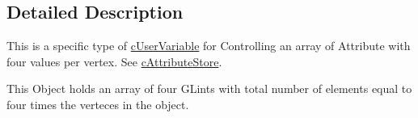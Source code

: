 \subsection{Detailed Description}
This is a specific type of \hyperlink{classc_user_variable}{cUserVariable} for Controlling an array of Attribute with four values per vertex. See \hyperlink{classc_attribute_store}{cAttributeStore}. 

This Object holds an array of four GLints with total number of elements equal to four times the verteces in the object. 